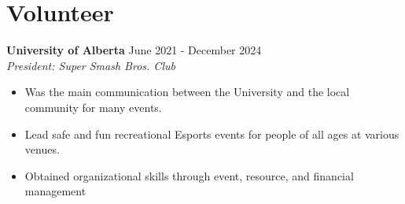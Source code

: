 \documentclass[letterpaper, 10pt]{article}
\newcommand{\secStartSpace}{\vspace{3pt}}
\newcommand{\secEndSpace}{\vspace{5pt}}
\newcommand{\workHeader}[3]{
\noindent \large{\textbf{\textcolor{TextColor}{#1}}} \hfill \normalsize{#3}\vspace{2pt}\\
	\textit{#2}\vspace{-2pt}
}
\begin{document}
\section{\color{blue} \textbf{Volunteer}}
\secStartSpace

\begin{addmargin}[0.5em]{1em}
	\workHeader{University of Alberta}{President: Super Smash Bros. Club}{June 2021 - December 2024}
	\begin{itemize}
        \item Was the main communication between the University and the local community for many events.
        \item Lead safe and fun recreational Esports events for people of all ages at various venues.
        \item Obtained organizational skills through event, resource, and financial management
    \end{itemize}
\end{addmargin}
\secEndSpace
\secEndSpace
\end{document}
